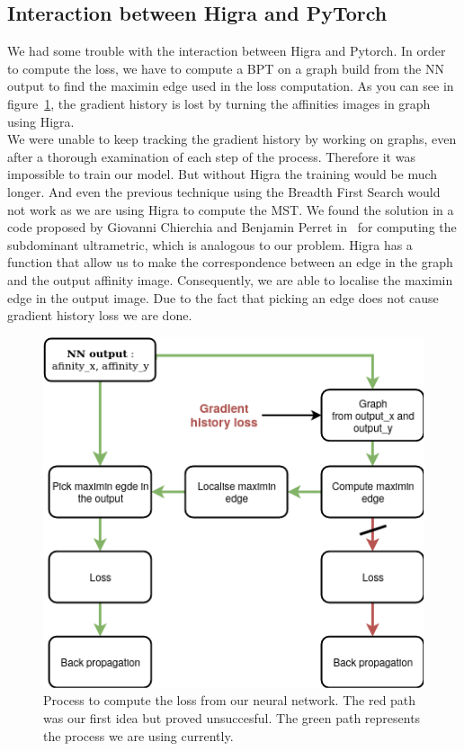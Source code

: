 \subsection{Interaction between Higra and PyTorch}

We had some trouble with the interaction between Higra and Pytorch. In order to
compute the loss, we have to compute a BPT on a graph build from the NN output
to find the maximin edge used in the loss computation. As you can see in
figure~\ref{fig:bpt_method}, the gradient history is lost by turning the
affinities images in graph using Higra.\\
We were unable to keep tracking the gradient history by working on
graphs, even after a thorough examination of each step of the process. 
Therefore it was impossible to train our model. But without Higra the
training would be much longer. And even the previous technique using the
Breadth First Search would not work as we are using Higra to compute the MST.
We found the solution in a code proposed by Giovanni Chierchia and Benjamin
Perret in~\cite{chierchia_ultrametric_2019} for computing the subdominant
ultrametric, which is analogous to our problem. Higra has a function that
allow us to make the correspondence between an edge in the graph and the output
affinity image. Consequently, we are able to localise the maximin edge in the
output image. Due to the fact that picking an edge does not cause gradient
history loss we are done.

\begin{figure}[!htbp]
	\centering
	\includegraphics[width=0.6\linewidth]{./images/gradient_history.png}
	\caption{Process to compute the loss from our neural network. The red path
	was our first idea but proved unsuccesful. The green path represents the
process we are using currently.}
	\label{fig:bpt_method}
\end{figure}


